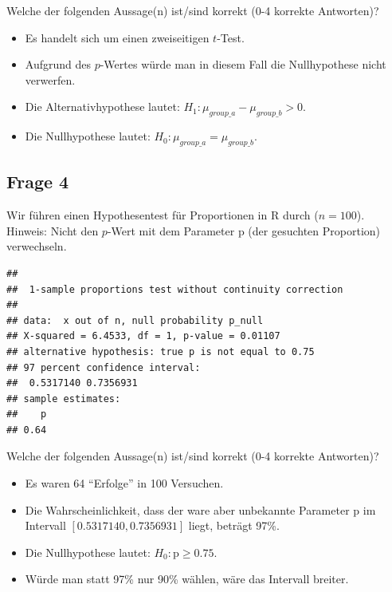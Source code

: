 \documentclass[
]{book}
\providecommand{\tightlist}{%
  \setlength{\itemsep}{0pt}\setlength{\parskip}{0pt}}
\begin{document}
Welche der folgenden Aussage(n) ist/sind korrekt (0-4 korrekte Antworten)?

\begin{itemize}
\tightlist
\item
  Es handelt sich um einen zweiseitigen \(t\)-Test.
\item
  Aufgrund des \(p\)-Wertes würde man in diesem Fall die Nullhypothese nicht verwerfen.
\item
  Die Alternativhypothese lautet: \(H_1: \mu_{group\_a} - \mu_{group\_b} > 0\).
\item
  Die Nullhypothese lautet: \(H_0: \mu_{group\_a} = \mu_{group\_b}\).
\end{itemize}

\subsection{Frage 4}\label{frage-4-1}

Wir führen einen Hypothesentest für Proportionen in R durch (\(n=100\)).
Hinweis: Nicht den \(p\)-Wert mit dem Parameter p (der gesuchten Proportion) verwechseln.

\begin{verbatim}
## 
##  1-sample proportions test without continuity correction
## 
## data:  x out of n, null probability p_null
## X-squared = 6.4533, df = 1, p-value = 0.01107
## alternative hypothesis: true p is not equal to 0.75
## 97 percent confidence interval:
##  0.5317140 0.7356931
## sample estimates:
##    p 
## 0.64
\end{verbatim}

Welche der folgenden Aussage(n) ist/sind korrekt (0-4 korrekte Antworten)?

\begin{itemize}
\tightlist
\item
  Es waren 64 ``Erfolge'' in 100 Versuchen.
\item
  Die Wahrscheinlichkeit, dass der ware aber unbekannte Parameter p im
  Intervall \([0.5317140, 0.7356931]\) liegt, beträgt 97\%.
\item
  Die Nullhypothese lautet: \(H_0: \text{p} \ge 0.75\).
\item
  Würde man statt 97\% nur 90\% wählen, wäre das Intervall breiter.
\end{itemize}

  
\end{document}
